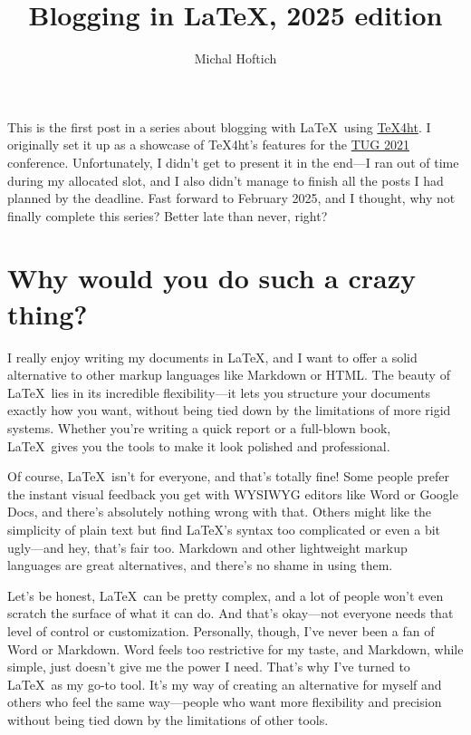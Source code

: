 \documentclass{article}
\title{Blogging in LaTeX, 2025 edition}
\author{Michal Hoftich}
\begin{document}
\maketitle


This is the first post in a series about blogging with \LaTeX\ using
\href{https://tug.org/tex4ht/}{\TeX4ht}. I originally set it up as a showcase
of \TeX4ht’s features for the \href{https://tug.org/tug2021/}{TUG 2021}
conference. Unfortunately, I didn’t get to present it in the end—I ran out of
time during my allocated slot, and I also didn’t manage to finish all the posts
I had planned by the deadline. Fast forward to February 2025, and I thought,
why not finally complete this series? Better late than never, right?


\tableofcontents

\section{Why would you do such a crazy thing?}


I really enjoy writing my documents in \LaTeX, and I want to offer a solid
alternative to other markup languages like Markdown or HTML. The beauty of
\LaTeX\ lies in its incredible flexibility—it lets you structure your documents
exactly how you want, without being tied down by the limitations of more rigid
systems. Whether you're writing a quick report or a full-blown book, \LaTeX\
gives you the tools to make it look polished and professional.

Of course, \LaTeX\ isn’t for everyone, and that’s totally fine! Some people
prefer the instant visual feedback you get with WYSIWYG editors like Word or
Google Docs, and there’s absolutely nothing wrong with that. Others might like
the simplicity of plain text but find \LaTeX’s syntax too complicated or even a
bit ugly—and hey, that’s fair too. Markdown and other lightweight markup
languages are great alternatives, and there’s no shame in using them.

Let’s be honest, \LaTeX\ can be pretty complex, and a lot of people won’t even
scratch the surface of what it can do. And that’s okay—not everyone needs that
level of control or customization. Personally, though, I’ve never been a fan of
Word or Markdown. Word feels too restrictive for my taste, and Markdown, while
simple, just doesn’t give me the power I need. That’s why I’ve turned to
\LaTeX\ as my go-to tool. It’s my way of creating an alternative for myself and
others who feel the same way—people who want more flexibility and precision
without being tied down by the limitations of other tools.
\end{document}
